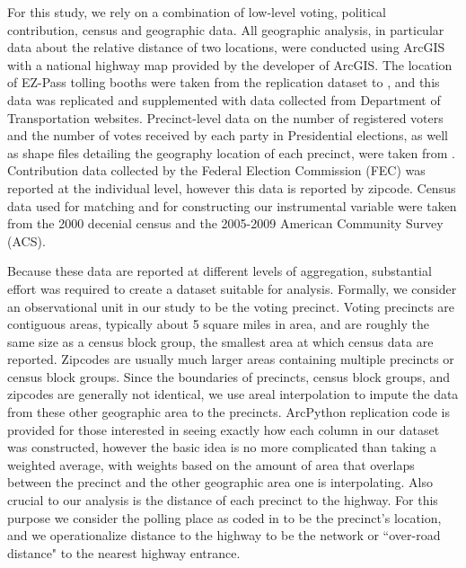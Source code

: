 For this study, we rely on a combination of low-level voting, political contribution, census and geographic data. All geographic analysis, in particular data about the relative distance of two locations, were conducted using ArcGIS with a national highway map provided by the developer of ArcGIS. The location of EZ-Pass tolling booths were taken from the replication dataset to \textcite{Currie2011a}, and this data was replicated and supplemented with data collected from Department of Transportation websites. Precinct-level data on the number of registered voters and the number of votes received by each party in Presidential elections, as well as shape files detailing the geography location of each precinct, were taken from \textcite{Ansolabehere2014}. Contribution data collected by the Federal Election Commission (FEC) was reported at the individual level, however this data is reported by zipcode. Census data used for matching and for constructing our instrumental variable were taken from the 2000 decenial census and the 2005-2009 American Community Survey (ACS). 

Because these data are reported at different levels of aggregation, substantial effort was required to create a dataset suitable for analysis. Formally, we consider an observational unit in our study to be the voting precinct. Voting precincts are contiguous areas, typically about 5 square miles in area, and are roughly the same size as a census block group, the smallest area at which census data are reported. Zipcodes are usually much larger areas containing multiple precincts or census block groups. Since the boundaries of precincts, census block groups, and zipcodes are generally not identical, we use areal interpolation to impute the data from these other geographic area to the precincts. ArcPython replication code is provided for those interested in seeing exactly how each column in our dataset was constructed, however the basic idea is no more complicated than taking a weighted average, with weights based on the amount of area that overlaps between the precinct and the other geographic area one is interpolating. Also crucial to our analysis is the distance of each precinct to the highway. For this purpose we consider the polling place as coded in \textcite{Ansolabehere2014} to be the precinct's location, and we operationalize distance to the highway to be the network or ``over-road distance" to the nearest highway entrance.  